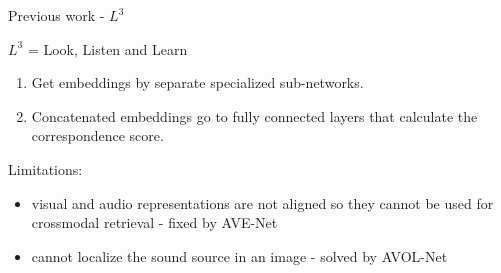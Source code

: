 \documentclass{beamer}
\begin{document}
\begin{frame}{Previous work - $L^3$}

$L^3$ = Look, Listen and Learn \cite{cit:l3}


\begin{enumerate}
\item Get embeddings by separate specialized sub-networks.
\item Concatenated embeddings go to fully connected layers that calculate the correspondence score.
\end{enumerate}



\vfill

Limitations:

\begin{itemize}
\item visual and audio representations are not aligned so they cannot be used for crossmodal retrieval - fixed by AVE-Net
\item cannot localize the sound source in an image - solved by AVOL-Net
\end{itemize}


\end{frame}
\end{document}
